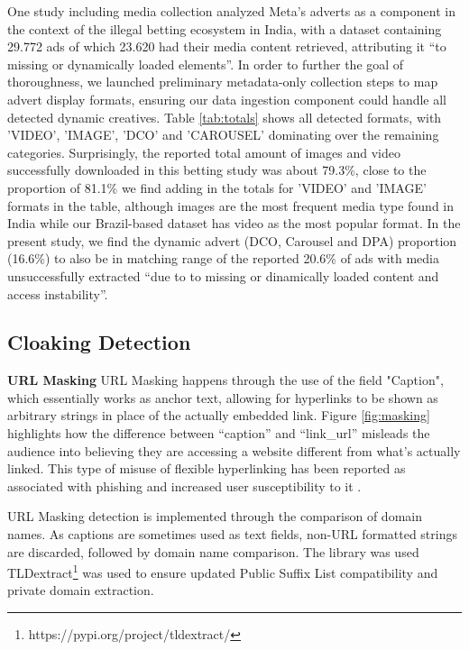 One study including media collection \cite{adLibBet} analyzed Meta's adverts as a component in the context of the illegal betting ecosystem in India, with a dataset containing 29.772 ads of which 23.620 had their media content retrieved, attributing it ``to missing or dynamically loaded elements''. In order to further the goal of thoroughness, we launched preliminary metadata-only collection steps to map advert display formats, ensuring our data ingestion component could handle all detected dynamic creatives. Table \ref{tab:totals} shows all detected formats, with 'VIDEO', 'IMAGE', 'DCO' and 'CAROUSEL' dominating over the remaining categories. Surprisingly, the reported total amount of images and video successfully downloaded in this betting study was about 79.3\%, close to the proportion of 81.1\% we find adding in the totals for 'VIDEO' and 'IMAGE' formats in the table, although images are the most frequent media type found in India while our Brazil-based dataset has video as the most popular format. In the present study, we find the dynamic advert (DCO, Carousel and DPA) proportion (16.6\%) to also be in matching range of the reported 20.6\% of ads with media unsuccessfully extracted ``due to to missing or dinamically loaded content and access instability''.



\subsection{Cloaking Detection}
\textbf{URL Masking}
URL Masking happens through the use of the field "Caption", which essentially works as anchor text, allowing for hyperlinks to be shown as arbitrary strings in place of the actually embedded link. Figure \ref{fig:masking} highlights how the difference between ``caption'' and ``link\_url'' misleads the audience into believing they are accessing a website different from what's actually linked. This type of misuse of flexible hyperlinking has been reported as associated with phishing \cite{shortPathPhishing, urlPhishCloak} and increased user susceptibility to it \cite{urlMaskClick, hyperlinkMaskingPhishEmail}.

URL Masking detection is implemented through the comparison of domain names. As captions are sometimes used as text fields, non-URL formatted strings are discarded, followed by domain name comparison. The library was used TLDextract\footnote{https://pypi.org/project/tldextract/} was used to ensure updated Public Suffix List compatibility and private domain extraction. 

